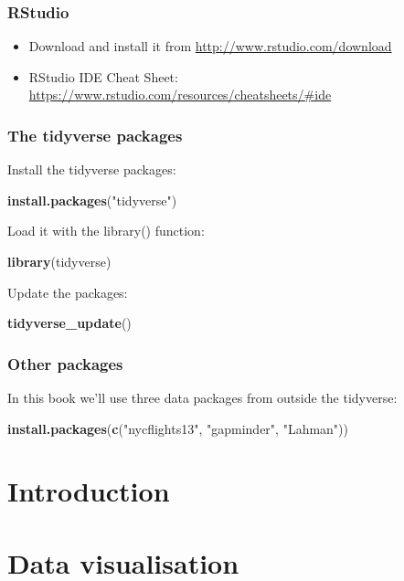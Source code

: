 \documentclass[]{book}
\newenvironment{Shaded}{\begin{snugshade}}{\end{snugshade}}
\newcommand{\KeywordTok}[1]{\textcolor[rgb]{0.13,0.29,0.53}{\textbf{#1}}}
\newcommand{\NormalTok}[1]{#1}
\newcommand{\StringTok}[1]{\textcolor[rgb]{0.31,0.60,0.02}{#1}}
\providecommand{\tightlist}{%
  \setlength{\itemsep}{0pt}\setlength{\parskip}{0pt}}
\begin{document}
\hypertarget{rstudio}{%
\subsection{RStudio}\label{rstudio}}

\begin{itemize}
\tightlist
\item
  Download and install it from \url{http://www.rstudio.com/download}
\item
  RStudio IDE Cheat Sheet: \url{https://www.rstudio.com/resources/cheatsheets/\#ide}
\end{itemize}

\hypertarget{the-tidyverse-packages}{%
\subsection{The tidyverse packages}\label{the-tidyverse-packages}}

Install the tidyverse packages:

\begin{Shaded}
\begin{Highlighting}[]
\KeywordTok{install.packages}\NormalTok{(}\StringTok{"tidyverse"}\NormalTok{)}
\end{Highlighting}
\end{Shaded}

Load it with the library() function:

\begin{Shaded}
\begin{Highlighting}[]
\KeywordTok{library}\NormalTok{(tidyverse)}
\end{Highlighting}
\end{Shaded}

Update the packages:

\begin{Shaded}
\begin{Highlighting}[]
\KeywordTok{tidyverse_update}\NormalTok{()}
\end{Highlighting}
\end{Shaded}

\hypertarget{other-packages}{%
\subsection{Other packages}\label{other-packages}}

In this book we'll use three data packages from outside the tidyverse:

\begin{Shaded}
\begin{Highlighting}[]
\KeywordTok{install.packages}\NormalTok{(}\KeywordTok{c}\NormalTok{(}\StringTok{"nycflights13"}\NormalTok{, }\StringTok{"gapminder"}\NormalTok{, }\StringTok{"Lahman"}\NormalTok{))}
\end{Highlighting}
\end{Shaded}

\hypertarget{introduction}{%
\chapter{Introduction}\label{introduction}}

\hypertarget{data-visualisation}{%
\chapter{Data visualisation}\label{data-visualisation}}
\end{document}
